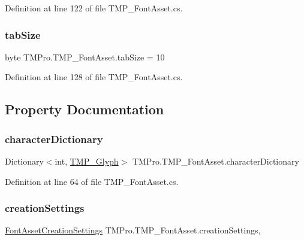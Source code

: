 Definition at line 122 of file T\+M\+P\+\_\+\+Font\+Asset.\+cs.

\mbox{\label{class_t_m_pro_1_1_t_m_p___font_asset_ac1e563b82e8b03679c9c1c21f2eaf579}} 
\subsubsection{\texorpdfstring{tabSize}{tabSize}}
{\footnotesize\ttfamily byte T\+M\+Pro.\+T\+M\+P\+\_\+\+Font\+Asset.\+tab\+Size = 10}



Definition at line 128 of file T\+M\+P\+\_\+\+Font\+Asset.\+cs.



\subsection{Property Documentation}
\mbox{\label{class_t_m_pro_1_1_t_m_p___font_asset_a9ed6ac03958d8cbf8d243dde765520d5}} 
\subsubsection{\texorpdfstring{characterDictionary}{characterDictionary}}
{\footnotesize\ttfamily Dictionary$<$int, \mbox{\hyperlink{class_t_m_pro_1_1_t_m_p___glyph}{T\+M\+P\+\_\+\+Glyph}}$>$ T\+M\+Pro.\+T\+M\+P\+\_\+\+Font\+Asset.\+character\+Dictionary\hspace{0.3cm}{\ttfamily [get]}}



Definition at line 64 of file T\+M\+P\+\_\+\+Font\+Asset.\+cs.

\mbox{\label{class_t_m_pro_1_1_t_m_p___font_asset_a5add1fb1c5ac1afb72c1f6c5b64f9d8a}} 
\subsubsection{\texorpdfstring{creationSettings}{creationSettings}}
{\footnotesize\ttfamily \mbox{\hyperlink{struct_t_m_pro_1_1_font_asset_creation_settings}{Font\+Asset\+Creation\+Settings}} T\+M\+Pro.\+T\+M\+P\+\_\+\+Font\+Asset.\+creation\+Settings\hspace{0.3cm}{\ttfamily [get]}, {\ttfamily [set]}}



